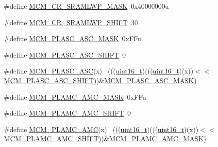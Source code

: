 \begin{DoxyCompactItemize}
\item 
\#define \hyperlink{group___m_c_m___register___masks_ga93830e2785e77585febe87f0bc83da5c}{M\+C\+M\+\_\+\+C\+R\+\_\+\+S\+R\+A\+M\+L\+W\+P\+\_\+\+M\+A\+SK}~0x40000000u
\item 
\#define \hyperlink{group___m_c_m___register___masks_ga7c3a04f9ed4a8824e212536c1d783fea}{M\+C\+M\+\_\+\+C\+R\+\_\+\+S\+R\+A\+M\+L\+W\+P\+\_\+\+S\+H\+I\+FT}~30
\item 
\#define \hyperlink{group___m_c_m___register___masks_ga215cf860c41174735020a34e7ccf9590}{M\+C\+M\+\_\+\+P\+L\+A\+S\+C\+\_\+\+A\+S\+C\+\_\+\+M\+A\+SK}~0x\+F\+Fu
\item 
\#define \hyperlink{group___m_c_m___register___masks_ga88f833168fd51e1b3c950e21b00bbfc3}{M\+C\+M\+\_\+\+P\+L\+A\+S\+C\+\_\+\+A\+S\+C\+\_\+\+S\+H\+I\+FT}~0
\item 
\#define \hyperlink{group___m_c_m___register___masks_gadbabfd7e827544257764056bbc98fd34}{M\+C\+M\+\_\+\+P\+L\+A\+S\+C\+\_\+\+A\+SC}(x)                                              ~(((\hyperlink{_p_e___types_8h_a1f1825b69244eb3ad2c7165ddc99c956}{uint16\+\_\+t})(((\hyperlink{_p_e___types_8h_a1f1825b69244eb3ad2c7165ddc99c956}{uint16\+\_\+t})(x))$<$$<$\hyperlink{group___m_c_m___register___masks_ga88f833168fd51e1b3c950e21b00bbfc3}{M\+C\+M\+\_\+\+P\+L\+A\+S\+C\+\_\+\+A\+S\+C\+\_\+\+S\+H\+I\+FT}))\&\hyperlink{group___m_c_m___register___masks_ga215cf860c41174735020a34e7ccf9590}{M\+C\+M\+\_\+\+P\+L\+A\+S\+C\+\_\+\+A\+S\+C\+\_\+\+M\+A\+SK})
\item 
\#define \hyperlink{group___m_c_m___register___masks_ga7988227df54012705c7f522f348214ee}{M\+C\+M\+\_\+\+P\+L\+A\+M\+C\+\_\+\+A\+M\+C\+\_\+\+M\+A\+SK}~0x\+F\+Fu
\item 
\#define \hyperlink{group___m_c_m___register___masks_gaa1b3153d0bf749f80fffacd948dd4bd4}{M\+C\+M\+\_\+\+P\+L\+A\+M\+C\+\_\+\+A\+M\+C\+\_\+\+S\+H\+I\+FT}~0
\item 
\#define \hyperlink{group___m_c_m___register___masks_ga62d94ee71c272adf6c5a19fad692672c}{M\+C\+M\+\_\+\+P\+L\+A\+M\+C\+\_\+\+A\+MC}(x)                                              ~(((\hyperlink{_p_e___types_8h_a1f1825b69244eb3ad2c7165ddc99c956}{uint16\+\_\+t})(((\hyperlink{_p_e___types_8h_a1f1825b69244eb3ad2c7165ddc99c956}{uint16\+\_\+t})(x))$<$$<$\hyperlink{group___m_c_m___register___masks_gaa1b3153d0bf749f80fffacd948dd4bd4}{M\+C\+M\+\_\+\+P\+L\+A\+M\+C\+\_\+\+A\+M\+C\+\_\+\+S\+H\+I\+FT}))\&\hyperlink{group___m_c_m___register___masks_ga7988227df54012705c7f522f348214ee}{M\+C\+M\+\_\+\+P\+L\+A\+M\+C\+\_\+\+A\+M\+C\+\_\+\+M\+A\+SK})

\end{DoxyCompactItemize}

